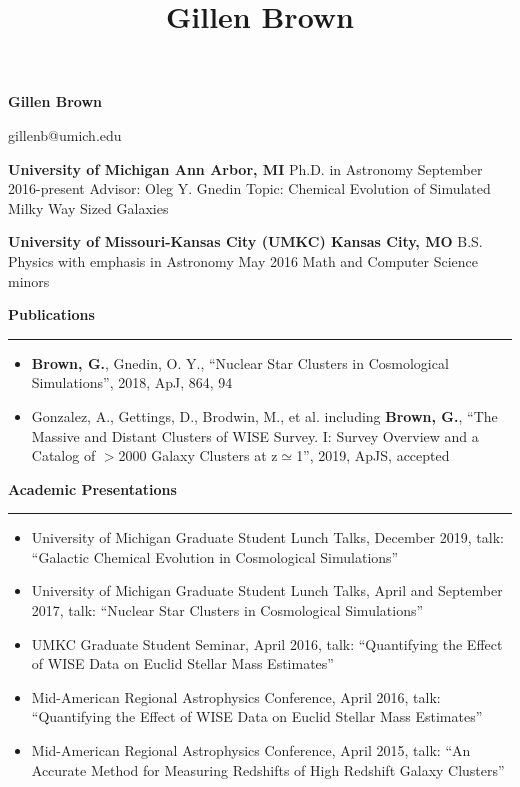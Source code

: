 \documentclass[10pt]{article}
\title{Gillen Brown}
\newcommand{\header}[1]{\vspace{2em}\par \textbf{\large #1}\strut\hrule\vspace{0em}}
\newcommand{\actionHeader}[2]{\textbf{#1 \hfill #2}}
\newcommand{\indentedItemDate}[2]{\newline\null\qquad #1 \hfill #2}
\newcommand{\indentedItem}[1]{\newline\null\qquad #1}
\begin{document}
\thispagestyle{empty}


\begin{center}
{\huge \bf Gillen Brown}

{\Large gillenb@umich.edu}
\end{center}
\bigskip

\actionHeader{University of Michigan}{Ann Arbor, MI}
\indentedItemDate{Ph.D. in Astronomy}{September 2016-present}
\indentedItem{Advisor: Oleg Y. Gnedin} 
\indentedItem{Topic: Chemical Evolution of Simulated Milky Way Sized Galaxies}

\actionHeader{University of Missouri-Kansas City (UMKC)}{Kansas City, MO}
\indentedItemDate{B.S. Physics with emphasis in Astronomy}{May 2016}
\indentedItem{Math and Computer Science minors}

\header{Publications}
\begin{itemize}
    \item \textbf{Brown, G.}, Gnedin, O. Y.,  ``Nuclear Star Clusters in Cosmological Simulations'', 2018, ApJ, 864, 94
    \item Gonzalez, A., Gettings, D., Brodwin, M., et al. including \textbf{Brown, G.}, ``The Massive and Distant Clusters of WISE Survey. I: Survey Overview and a Catalog of $>$2000 Galaxy Clusters at z$\simeq$1'', 2019, ApJS, accepted
\end{itemize}

\header{Academic Presentations}
\begin{itemize}
    \item University of Michigan Graduate Student Lunch Talks, December 2019, talk: ``Galactic Chemical Evolution in Cosmological Simulations''
    \item University of Michigan Graduate Student Lunch Talks, April and September 2017, talk: ``Nuclear Star Clusters in Cosmological Simulations''
    \item UMKC Graduate Student Seminar, April 2016, talk: ``Quantifying the Effect of WISE Data on Euclid Stellar Mass Estimates''
    \item Mid-American Regional Astrophysics Conference, April 2016, talk: ``Quantifying the Effect of WISE Data on Euclid Stellar Mass Estimates''
    \item Mid-American Regional Astrophysics Conference, April 2015, talk: ``An Accurate Method for Measuring Redshifts of High Redshift Galaxy Clusters''
\end{itemize}
\end{document}

